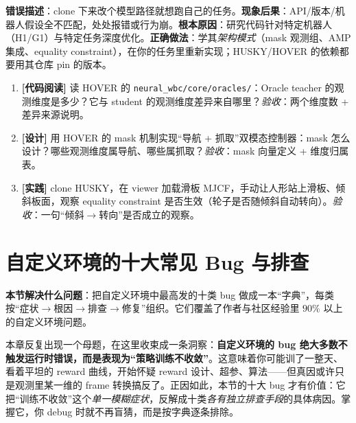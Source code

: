 \begin{pitfall}
\textbf{错误描述}：clone 下来改个模型路径就想跑自己的任务。\textbf{现象后果}：API/版本/机器人假设全不匹配，处处报错或行为崩。\textbf{根本原因}：研究代码针对特定机器人（H1/G1）与特定任务深度优化。\textbf{正确做法}：学其\emph{架构模式}（mask 观测组、AMP 集成、equality constraint），在你的任务里重新实现；HUSKY/HOVER 的依赖都要用其仓库 pin 的版本。
\end{pitfall}

\begin{practice}[案例精读]
\begin{enumerate}
\item \textbf{[代码阅读]} 读 HOVER 的 \verb|neural_wbc/core/oracles/|：Oracle teacher 的观测维度是多少？它与 student 的观测维度差异来自哪里？\emph{验收}：两个维度数 + 差异来源说明。
\item \textbf{[设计]} 用 HOVER 的 mask 机制实现“导航 + 抓取”双模态控制器：mask 怎么设计？哪些观测维度属导航、哪些属抓取？\emph{验收}：mask 向量定义 + 维度归属表。
\item \textbf{[实践]} clone HUSKY，在 viewer 加载滑板 MJCF，手动让人形站上滑板、倾斜板面，观察 equality constraint 是否生效（轮子是否随倾斜自动转向）。\emph{验收}：一句“倾斜$\to$转向”是否成立的观察。
\end{enumerate}
\end{practice}

\section{自定义环境的十大常见 Bug 与排查}
\label{sec:rlmc-diy-bugs}

\textbf{本节解决什么问题}：把自定义环境中最高发的十类 bug 做成一本“字典”，每类按“症状$\to$根因$\to$排查$\to$修复”组织。它们覆盖了作者与社区经验里 $90\%$ 以上的自定义环境问题。

\begin{insight}\label{ins:rlmc-diy-silentbug}
本章反复出现一个母题，在这里收束成一条洞察：\textbf{自定义环境的 bug 绝大多数不触发运行时错误，而是表现为“策略训练不收敛”}。这意味着你可能训了一整天、看着平坦的 reward 曲线，开始怀疑 reward 设计、超参、算法——但真因或许只是观测里某一维的 frame 转换搞反了。正因如此，本节的十大 bug 才有价值：它把“训练不收敛”这个\emph{单一模糊症状}，反解成十类\emph{各有独立排查手段}的具体病因。掌握它，你 debug 时就不再盲猜，而是按字典逐条排除。
\end{insight}

